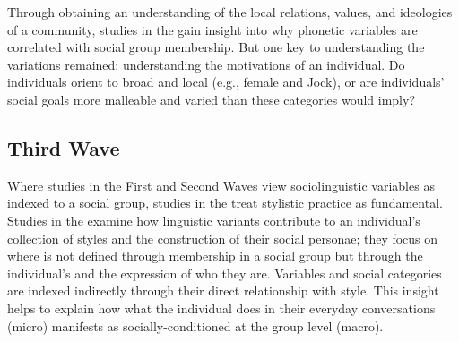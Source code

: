 
Through obtaining an understanding of the local relations, values, and ideologies of a community, studies in the  gain insight into why phonetic variables are correlated with social group membership. But one key to understanding the variations remained: understanding the motivations of an individual. Do individuals orient to broad and local  (e.g., female and Jock), or are individuals' social goals more malleable and varied than these categories would imply? 


\subsection{Third Wave}\label{sec:thirdwave}

Where studies in the First and Second Waves view sociolinguistic variables as indexed to a social group, studies in the  treat stylistic practice as fundamental. Studies in the  examine how linguistic variants contribute to an individual's collection of styles and the construction of their social personae; they focus on  where  is not defined through membership in a social group but through the individual's  and the expression of who they are. Variables and social categories are indexed indirectly through their direct relationship with style. This insight helps to explain how what the individual does in their everyday conversations (micro) manifests as socially-conditioned at the group level (macro).

